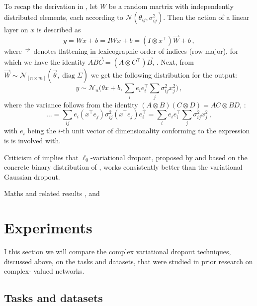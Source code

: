\documentclass[a4paper,10pt]{article}
\renewcommand{\vec}{\overrightarrow}
\begin{document}
To recap the derivation in \cite{kingma_variational_2015}, let $W$ be a random martrix
with independently distributed elements, each according to $\mathcal{N}(\theta_{ij}, \sigma^2_{ij})$.
Then the action of a linear layer on $x$ is described as 
$$
  y = W x + b = I W x + b
    = (I \otimes x^\top) \vec{W} + b
  \,, $$
where $\vec{\cdot}$ denotes flattening in lexicographic order of indices (row-major),
for which we have the identity $\vec{A B C} = (A \otimes C^\top) \vec{B}$, \cite{cookbook2012}.
Next, from $\vec{W}\sim \mathcal{N}_{[n\times m]}(\vec{\theta}, \mathop{diag}\Sigma)$
we get the following distribution for the output:
$$
  y \sim \mathcal{N}_{n}
    \bigl(
      \theta x + b,
      \sum_{i} e_i e_i^\top \sum_j \sigma^2_{ij} x_j^2
    \bigr)
  \,, $$
where the variance follows from the identity $(A\otimes B)(C\otimes D) = AC\otimes BD$,
\cite{cookbook2012}:
$$
  \ldots
    = \sum_{ij} e_i (x^\top e_j) \sigma^2_{ij} (x^\top e_j) e_i^\top
    = \sum_{i} e_i e_i^\top \sum_j \sigma^2_{ij} x_j^2
  \,, $$
with $e_i$ being the $i$-th unit vector of dimensionality conforming to the expression
is is involved with.

Criticism of \cite{gale_state_2019} implies that $\ell_0$-variational dropout,
proposed by \cite{louizos_learning_2017} and based on the concrete binary distribution
of \cite{maddison_concrete_2016}, works consistently better than the variational
Gaussian dropout.

Maths and related results \cite{pav_moments_2015,taubock_complex-valued_2012},
and \cite{karseras_caution:_nodate}


\section{Experiments} %
\label{sec:Experiments}

I this section we will compare the complex variational dropout techniques, discussed
above, on the tasks and datasets, that were studied in prior research on complex-%
valued networks.

\subsection{Tasks and datasets} %
\label{sub:tasks_and_datasets}
\end{document}
